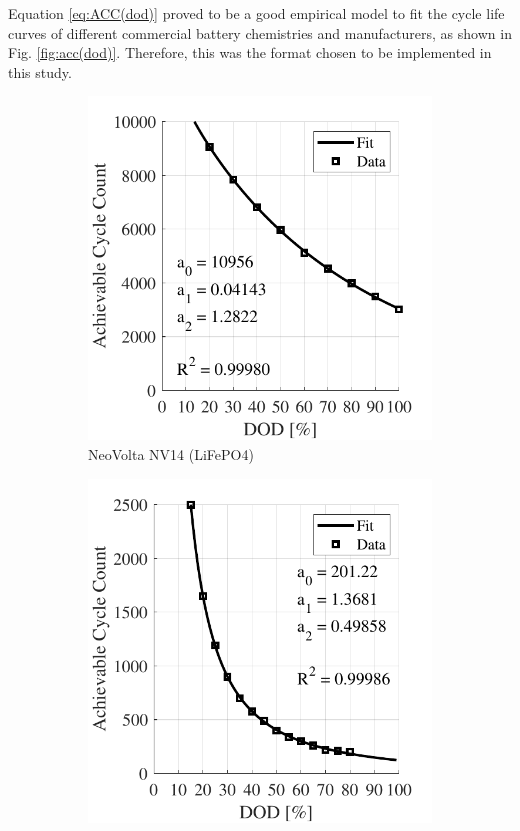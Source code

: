 \documentclass{ieeeaccess}
\begin{document}
    Equation \eqref{eq:ACC(dod)} proved to be a good empirical model to fit the cycle life curves of different commercial battery chemistries and manufacturers, as shown in Fig. \ref{fig:acc(dod)}. Therefore, this was the format chosen to be implemented in this study.
    \begin{figure}[!h]
    	\begin{subfigure}{.235\textwidth}
    		\centering
    		\includegraphics[width=\linewidth]{figures/acc_fitting_NeoVolta_NV24_LiFePO4.pdf}
    		\caption{NeoVolta NV14 (LiFePO4)}
    		\label{fig:accNeovolta}
    	\end{subfigure}
    	\begin{subfigure}{.235\textwidth}
    		\centering
    		\includegraphics[width=\linewidth]{figures/acc_fitting_Moura_12MF220_lead-acid.pdf}

\end{subfigure}
\end{figure}
\end{document}

